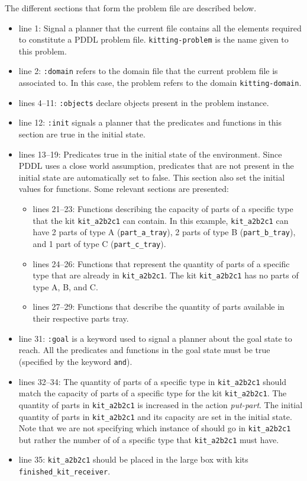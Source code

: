 The different sections that form the problem file are described below.
\begin{itemize}
\item line 1: Signal a planner that the current file contains all the elements required to constitute a PDDL problem file. \texttt{kitting-problem} is the name given to this problem.
\item line 2: \texttt{:domain} refers to the domain file that the current problem file is associated to. In this case, the problem refers to the domain \texttt{kitting-domain}.
\item lines 4--11: \texttt{:objects} declare objects present in the problem instance.
\item line 12: \texttt{:init} signals a planner that the predicates and functions in this section are true in the initial state.
\item lines 13--19: Predicates true in the initial state of the environment. Since PDDL uses a close world assumption, predicates that are not present in the initial state are automatically set to false. This section also set the initial values for functions. Some relevant sections are presented:
\begin{itemize}
\item lines 21--23: Functions describing the capacity of parts of a specific type that the kit \texttt{kit\_a2b2c1} can contain. In this example, \texttt{kit\_a2b2c1} can have 2 parts of type A (\texttt{part\_a\_tray}), 2 parts of type B (\texttt{part\_b\_tray}), and 1 part of type C (\texttt{part\_c\_tray}).
\item lines 24--26: Functions that represent the quantity of parts of a specific type that are already in \texttt{kit\_a2b2c1}. The kit \texttt{kit\_a2b2c1} has no parts of type A, B, and C.
\item lines 27--29: Functions that describe the quantity of parts available in their respective parts tray.
\end{itemize}
\item line 31: \texttt{:goal} is a keyword used to signal a planner about the goal state to reach. All the predicates and functions in the goal state must be true (specified by the keyword \texttt{and}).
\item lines 32--34: The quantity of parts of a specific type in \texttt{kit\_a2b2c1} should match the capacity of parts of a specific type for the kit \texttt{kit\_a2b2c1}. The quantity of parts in \texttt{kit\_a2b2c1} is increased in the action \textit{put-part}. The initial quantity of parts in \texttt{kit\_a2b2c1} and its capacity are set in the initial state. Note that we are not specifying which instance of  should go in \texttt{kit\_a2b2c1} but rather the number of  of a specific type that \texttt{kit\_a2b2c1} must have.
\item line 35: \texttt{kit\_a2b2c1} should be placed in the large box with kits \\\texttt{finished\_kit\_receiver}.
\end{itemize}

